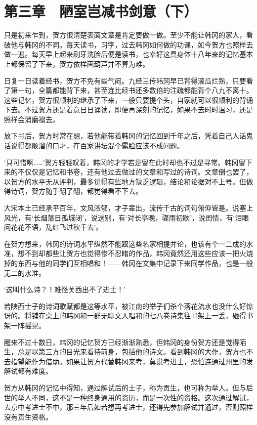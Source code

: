 \section{第三章　陋室岂减书剑意（下）}

只是初来乍到，贺方很清楚表面文章是肯定要做一做。至少不能让韩冈的家人，看破他与韩冈的不同。每天读书，习字，过去韩冈如何做的功课，如今贺方也照样去做一遍。每天早上起来刷牙洗脸后便是读书，也幸好这具身体十八年来的记忆基本上都保留了下来，贺方依样画葫芦并不算为难。

日复一日读着经书，贺方不免有些气闷。九经三传韩冈早已背得滚瓜烂熟，只要看了第一句，全篇都能背下来，甚至连比经书还多数倍的注疏都能背个八九不离十。这些记忆，贺方很顺利的继承了下来，一般只要提个头，自家就可以很顺利的背诵下去。不过贺方还是着意日日诵读，即便再深刻的记忆，如果不去时时温习，还是照样会消磨褪去。

放下书后，贺方时常在想，若他能带着韩冈的记忆回到千年之后，凭着自己人话鬼话说得都顺溜的口才，在百家讲坛混个露脸应该不成问题。

‘只可惜啊……’贺方轻轻叹着，韩冈的才学若是留在此时却也不过是寻常。韩冈留下来的不仅仅是记忆和书卷，还有他过去做过的文章和写过的诗词。文章倒也罢了，以贺方的水平无从评判，最多觉得有些地方缺乏逻辑，结论和论据对不上号。但做得诗词，贺方随手翻了翻，都觉得看不下去。

大宋本土已经承平百年，文风浓郁，才子辈出，流传千古的词句俯仰皆是。说塞上风光，有‘长烟落日孤城闭’，说送别，有‘对长亭晚，骤雨初歇’，说闺情，有‘泪眼问花花不语，乱红飞过秋千去’。

在贺方想来，韩冈的诗词水平纵然不能跟这些名家相提并论，也该有个一二成的水准，想不到却都些让贺方也觉得惨不忍睹的作品，韩冈竟然还用这些应该一把火烧掉的东西与他的同学们互相唱和！——韩冈在文集中记录下来同学作品，也是一般无二的水准。

‘这叫什么诗？！难怪关西出不了进士！’

若陕西士子的诗词歌赋都是这等水平，被江南的举子们杀个落花流水也没什么好惊讶的。将铺在桌上的韩冈和一群无聊文人唱和的七八卷诗集往书架上一丢，砸得书架一阵摇晃。

醒来不过十数日，韩冈的记忆贺方已经渐渐熟悉，但韩冈的身份贺方还是觉得陌生，总是以第三方的目光来看待前身，包括他的诗文。看到韩冈的大作，贺方也不去指望能作为借助。如果让贺方代替韩冈来考，莫说考进士，恐怕连通过州里的发解试都有难度。

贺方从韩冈的记忆中得知，通过解试后的士子，称为贡生，也可称为举人。但与后世的举人不同，这不是一种终身通用的资历，而是一次性的资格。这次通过解试，去京中考进士不中，那三年后如若想再考进士，还得先参加解试并通过，否则照样没有贡生资格。

